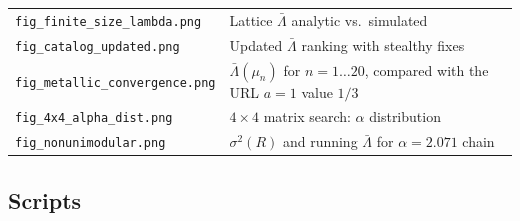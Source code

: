 \documentclass[11pt,letterpaper]{article}
\begin{document}
\begin{tabular}{ll}
\texttt{fig\_finite\_size\_lambda.png}  & Lattice $\bar\Lambda$ analytic vs.\ simulated \\
\texttt{fig\_catalog\_updated.png}      & Updated $\bar\Lambda$ ranking with stealthy fixes \\
\texttt{fig\_metallic\_convergence.png} & $\bar\Lambda(\mu_n)$ for $n=1\ldots20$, compared with the URL $a{=}1$ value $1/3$ \\
\texttt{fig\_4x4\_alpha\_dist.png}      & $4\times4$ matrix search: $\alpha$ distribution \\
\texttt{fig\_nonunimodular.png}         & $\sigma^2(R)$ and running $\bar\Lambda$ for $\alpha=2.071$ chain \\
\bottomrule
\end{tabular}

\subsection*{Scripts}
\end{document}
